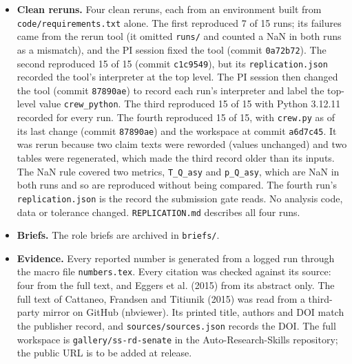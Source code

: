 \begin{itemize}
        moments of \texttt{vote} were not compared before the H1 run.
  \item \textbf{Clean reruns.} Four clean reruns, each from an environment built from
        \texttt{code/}\allowbreak\texttt{requirements.txt} alone. The first reproduced 7 of 15
        runs; its failures came from the rerun tool (it omitted \texttt{runs/} and counted a NaN
        in both runs as a mismatch), and the PI session fixed the tool (commit
        \texttt{0a72b72}). The second reproduced 15 of 15 (commit \texttt{c1c9549}), but its
        \texttt{replication.json} recorded the tool's interpreter at the top level. The PI
        session then changed the tool (commit \texttt{87890ae}) to record each run's interpreter
        and label the top-level value \texttt{crew\_python}. The third reproduced 15 of 15 with
        Python 3.12.11 recorded for every run. The fourth reproduced 15 of 15, with
        \texttt{crew.py} as of its last change (commit \texttt{87890ae}) and the workspace at
        commit \texttt{a6d7c45}. It was rerun because two claim texts were reworded (values
        unchanged) and two tables were regenerated, which made the third record older than its
        inputs. The NaN rule covered two metrics, \texttt{T\_Q\_asy} and \texttt{p\_Q\_asy}, which
        are NaN in both runs and so are reproduced without being compared. The fourth run's
        \texttt{replication.json} is the record the submission gate reads. No analysis code,
        data or tolerance changed. \texttt{REPLICATION.md} describes all four runs.
  \item \textbf{Briefs.} The role briefs are archived in \texttt{briefs/}.
  \item \textbf{Evidence.} Every reported number is generated from a logged run through
        the macro file \texttt{numbers.tex}. Every citation was checked against its source:
        four from the full text, and Eggers et al. (2015) from its abstract only. The full
        text of Cattaneo, Frandsen and Titiunik (2015) was read from a third-party mirror on
        GitHub (nbviewer). Its printed title, authors and DOI match the publisher record,
        and \texttt{sources/sources.json} records the DOI. The full workspace is
        \texttt{gallery/ss-rd-senate} in the Auto-Research-Skills repository; the public URL
        is to be added at release.
\end{itemize}
